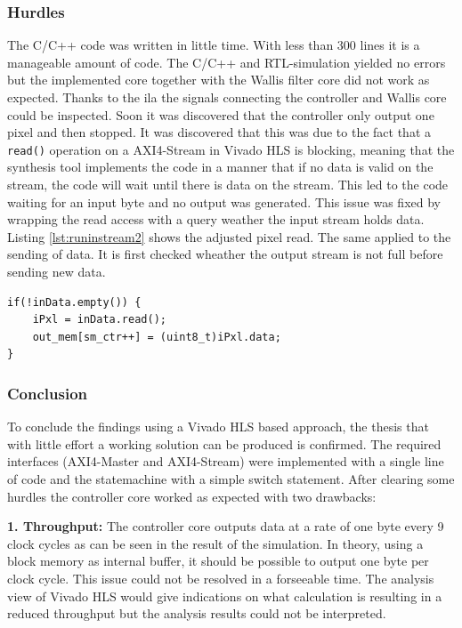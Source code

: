 \subsubsection*{Hurdles}
The C/C++ code was written in little time. With less than 300 lines it
is a manageable amount of code.
The C/C++ and RTL-simulation yielded no errors but the
implemented core together with the Wallis filter core did not work as expected.
Thanks to the \gls{ila} the signals connecting the controller
and Wallis core could be inspected. Soon it was discovered that the controller
only output one pixel and then stopped. It was discovered that this was due to
the fact that a \texttt{read()} operation on a AXI4-Stream in Vivado HLS is
blocking, meaning that the synthesis tool implements the code in a  manner that
if no data is
valid on the stream, the code will wait until there is data on the stream. This
led to the code waiting for an input byte and no output was generated. This
issue was fixed by wrapping the read access with a query weather the input
stream holds data. Listing \ref{lst:runinstream2} shows the adjusted pixel read.
The same applied to the sending of data. It is first checked wheather the output
stream is not full before sending new data.

\begin{minipage}{\textwidth}
\begin{lstlisting}[style=CStyle, caption=Pixel read store with query,
label=lst:runinstream2]
if(!inData.empty()) {
    iPxl = inData.read();
    out_mem[sm_ctr++] = (uint8_t)iPxl.data;
}\end{lstlisting}
\end{minipage}

\subsubsection*{Conclusion}
To conclude the findings using a Vivado HLS based approach, the thesis that
with little effort a working solution can be produced is confirmed. The required
interfaces (AXI4-Master and AXI4-Stream) were implemented with a single line of
code and the statemachine with a simple switch statement. After
clearing some hurdles the controller core worked as expected with two drawbacks:

\vspace{1ex}
\textbf{1. Throughput:} The controller core outputs data at a rate of one byte
every 9 clock cycles as can be seen in the result of the simulation.
In theory, using a block memory as internal buffer, it
should be possible to output one byte per clock cycle. This issue could not be
resolved in a forseeable time. The analysis view of Vivado HLS would give
indications on what calculation is resulting in a reduced throughput but the
analysis results could not be interpreted.

